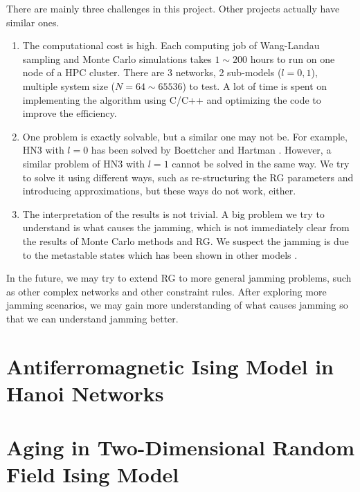 There are mainly three challenges in this project. Other projects actually have similar ones.
\begin{enumerate}
\item The computational cost is high. Each computing job of Wang-Landau sampling and Monte Carlo simulations takes $1\sim 200$ hours to run on one node of a HPC cluster. There are 3 networks, 2 sub-models ($l=0, 1$), multiple system size ($N=64\sim 65536$) to test. 
A lot of time is spent on implementing the algorithm using C/C++ and optimizing the code to improve the efficiency.

\item One problem is exactly solvable, but a similar one may not be. 
For example, HN3 with $l=0$ has been solved by Boettcher and Hartman \cite{BoHa11}. However, a similar problem of HN3 with $l=1$ cannot be solved in the same way. We try to solve it using different ways, such as  re-structuring the RG parameters and introducing approximations, but these ways do not work, either.  

\item The interpretation of the results is not trivial. A big problem we try to understand is what causes the jamming, which is not immediately clear from the results of Monte Carlo methods and RG. We suspect the jamming is due to the metastable states  which has been shown in other models \cite{Rivoire03, SibaniBo16, Eastham06prb}.
\end{enumerate}

In the future, we may try to extend RG to more general jamming problems, such as other complex networks and other constraint rules. After exploring more jamming scenarios, we may gain more understanding of what causes jamming so that we can understand jamming better.  





\section{Antiferromagnetic Ising Model in Hanoi Networks}



\section{Aging in Two-Dimensional Random Field Ising Model}